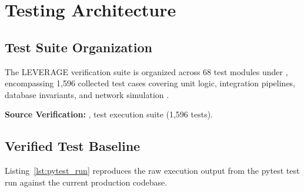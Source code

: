 \chapter{Testing Architecture}
\label{ch:testing_architecture}

\section{Test Suite Organization}
The LEVERAGE verification suite is organized across 68 test modules under , encompassing 1,596 collected test cases covering unit logic, integration pipelines, database invariants, and network simulation \cite{ref:factsheet}.

\begin{citationbox}
\textbf{Source Verification:} ,  test execution suite (1,596 tests).
\end{citationbox}

\section{Verified Test Baseline}
Listing~\ref{lst:pytest_run} reproduces the raw execution output from the pytest test run against the current production codebase.

